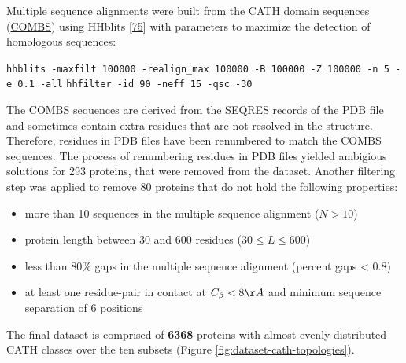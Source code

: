 \documentclass[12pt,a4paper,twoside]{book}
\providecommand{\tightlist}{%
  \setlength{\itemsep}{0pt}\setlength{\parskip}{0pt}}
\theoremstyle{definition}
\theoremstyle{definition}
\theoremstyle{remark}
\begin{document}
Multiple sequence alignments were built from the CATH domain sequences
(\href{http://www.cathdb.info/version/current/domain/3cdjA03/sequence}{COMBS})
using HHblits {[}\protect\hyperlink{ref-Remmert2012}{75}{]} with
parameters to maximize the detection of homologous sequences:

\texttt{hhblits\ -maxfilt\ 100000\ -realign\_max\ 100000\ -B\ 100000\ -Z\ 100000\ -n\ 5\ -e\ 0.1\ -all}
\texttt{hhfilter\ -id\ 90\ -neff\ 15\ -qsc\ -30}

The COMBS sequences are derived from the SEQRES records of the PDB file
and sometimes contain extra residues that are not resolved in the
structure. Therefore, residues in PDB files have been renumbered to
match the COMBS sequences. The process of renumbering residues in PDB
files yielded ambigious solutions for 293 proteins, that were removed
from the dataset. Another filtering step was applied to remove 80
proteins that do not hold the following properties:

\begin{itemize}
\tightlist
\item
  more than 10 sequences in the multiple sequence alignment (\(N>10\))
\item
  protein length between 30 and 600 residues (\(30 \leq L \leq 600\))
\item
  less than 80\% gaps in the multiple sequence alignment (percent gaps
  \textless{} 0.8)
\item
  at least one residue-pair in contact at \(C_\beta < 8\AA\) and minimum
  sequence separation of 6 positions
\end{itemize}

The final dataset is comprised of \textbf{6368} proteins with almost
evenly distributed CATH classes over the ten subsets (Figure
\ref{fig:dataset-cath-topologies}).
\end{document}
